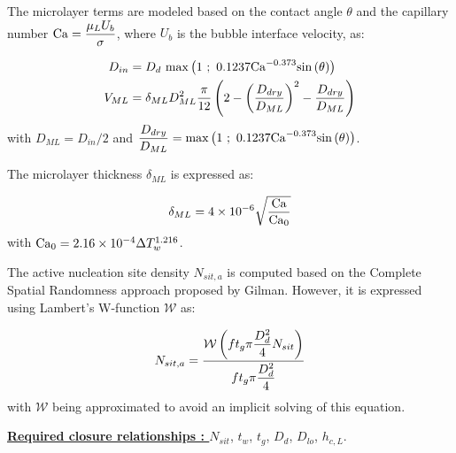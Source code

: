 The microlayer terms are modeled based on the contact angle $\theta$ and the capillary number $\mathrm{Ca} = \dfrac{\mu_{L} U_{b}}{\sigma}$, where $U_{b}$ is the bubble interface velocity, as:

\begin{align}
D_{in} &= D_{d}~ \mathrm{max}\left( 1\ ;\ 0.1237\mathrm{Ca}^{-0.373}\mathrm{sin}\left( \theta \right) \right)\\
V_{ML} &= \delta_{ML}D_{ML}^{2} \frac{\pi}{12} \left( 2 - \left( \frac{D_{dry}}{D_{ML}} \right)^{2} - \frac{D_{dry}}{D_{ML}} \right)
\end{align}
with $D_{ML} = D_{in} / 2$ and $\dfrac{D_{dry}}{D_{ML}} = \max{1\ ;\ 0.1237\Ca^{-0.373}\sin{\theta}}$.

\npar

The microlayer thickness $\delta_{ML}$ is expressed as:

\begin{equation}
\delta_{ML}= 4 \times 10^{-6} \sqrt{\frac{\mathrm{Ca}}{\mathrm{Ca}_{0}}}
\end{equation}
with $\mathrm{Ca}_{0} = 2.16 \times 10^{-4} \Delta T_{w}^{1.216}$.


\npar

The active nucleation site density $N_{sit,a}$ is computed based on the Complete Spatial Randomness approach proposed by Gilman. However, it is expressed using Lambert's W-function $\mathcal{W}$ as:

\begin{equation}
N_{sit,a} = \frac{\mathcal{W}\left( f t_{g} \pi \dfrac{D_{d}^{2}}{4} N_{sit} \right)}{f t_{g} \pi \dfrac{D_{d}^{2}}{4}}
\end{equation}
with $\mathcal{W}$ being approximated to avoid an implicit solving of this equation.

\npar

\textbf{\underline{Required closure relationships : }} $N_{sit}$, $t_{w}$, $t_{g}$, $D_{d}$, $D_{lo}$, $h_{c,L}$. 




